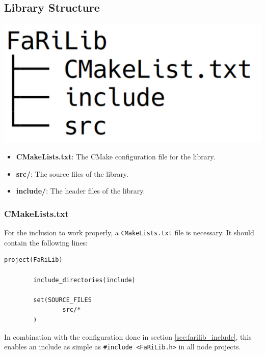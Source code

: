         \subsection{Library Structure}
            \begin{minipage}{0.48\textwidth}
                \includegraphics[width=0.8\linewidth]{assets/FaRiLibStructure.png}
                \label{fig:farilib_structure}
            \end{minipage}%
            \begin{minipage}{0.48\textwidth}
                \raggedright
                \begin{itemize}
                    \item \textbf{CMakeLists.txt}: The CMake configuration file for the 
                    library.
                    \item \textbf{src/}: The source files of the library.
                    \item \textbf{include/}: The header files of the library.
                \end{itemize}
            \end{minipage}
            \subsubsection{CMakeLists.txt}
            For the inclusion to work properly, a \texttt{CMakeLists.txt} file is
            necessary. It should contain the following lines: 
        \begin{lstlisting}[style=cppCode]
        project(FaRiLib)
    
        include_directories(include)
    
        set(SOURCE_FILES
                src/*
        )
        \end{lstlisting}
            In combination with the configuration done in section \ref{sec:farilib_include},
            this enables an include as simple as \texttt{\#include <FaRiLib.h>} in all
            node projects.
    
